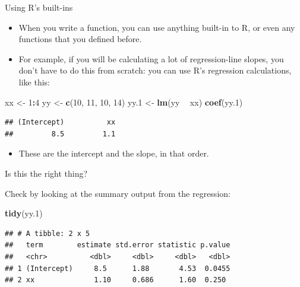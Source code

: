 \documentclass[ignorenonframetext,]{beamer}
\newenvironment{Shaded}{\begin{snugshade}}{\end{snugshade}}
\newcommand{\DecValTok}[1]{\textcolor[rgb]{0.00,0.00,0.81}{#1}}
\newcommand{\FloatTok}[1]{\textcolor[rgb]{0.00,0.00,0.81}{#1}}
\newcommand{\KeywordTok}[1]{\textcolor[rgb]{0.13,0.29,0.53}{\textbf{#1}}}
\newcommand{\NormalTok}[1]{#1}
\newcommand{\OperatorTok}[1]{\textcolor[rgb]{0.81,0.36,0.00}{\textbf{#1}}}
\newcommand{\StringTok}[1]{\textcolor[rgb]{0.31,0.60,0.02}{#1}}
\providecommand{\tightlist}{%
  \setlength{\itemsep}{0pt}\setlength{\parskip}{0pt}}
\begin{document}
\begin{frame}[fragile]{Using R's built-ins}
\protect\hypertarget{using-rs-built-ins}{}

\begin{itemize}
\tightlist
\item
  When you write a function, you can use anything built-in to R, or even
  any functions that you defined before.
\item
  For example, if you will be calculating a lot of regression-line
  slopes, you don't have to do this from scratch: you can use R's
  regression calculations, like this:
\end{itemize}

\begin{Shaded}
\begin{Highlighting}[]
\NormalTok{xx <-}\StringTok{ }\DecValTok{1}\OperatorTok{:}\DecValTok{4}
\NormalTok{yy <-}\StringTok{ }\KeywordTok{c}\NormalTok{(}\DecValTok{10}\NormalTok{, }\DecValTok{11}\NormalTok{, }\DecValTok{10}\NormalTok{, }\DecValTok{14}\NormalTok{)}
\NormalTok{yy}\FloatTok{.1}\NormalTok{ <-}\StringTok{ }\KeywordTok{lm}\NormalTok{(yy }\OperatorTok{~}\StringTok{ }\NormalTok{xx)}
\KeywordTok{coef}\NormalTok{(yy}\FloatTok{.1}\NormalTok{)}
\end{Highlighting}
\end{Shaded}

\begin{verbatim}
## (Intercept)          xx 
##         8.5         1.1
\end{verbatim}

\begin{itemize}
\tightlist
\item
  These are the intercept and the slope, in that order.
\end{itemize}

\end{frame}

\begin{frame}[fragile]{Is this the right thing?}
\protect\hypertarget{is-this-the-right-thing}{}

Check by looking at the summary output from the regression:

\begin{Shaded}
\begin{Highlighting}[]
\KeywordTok{tidy}\NormalTok{(yy}\FloatTok{.1}\NormalTok{)}
\end{Highlighting}
\end{Shaded}

\begin{verbatim}
## # A tibble: 2 x 5
##   term        estimate std.error statistic p.value
##   <chr>          <dbl>     <dbl>     <dbl>   <dbl>
## 1 (Intercept)     8.5      1.88       4.53  0.0455
## 2 xx              1.10     0.686      1.60  0.250
\end{verbatim}

\end{frame}
\end{document}

